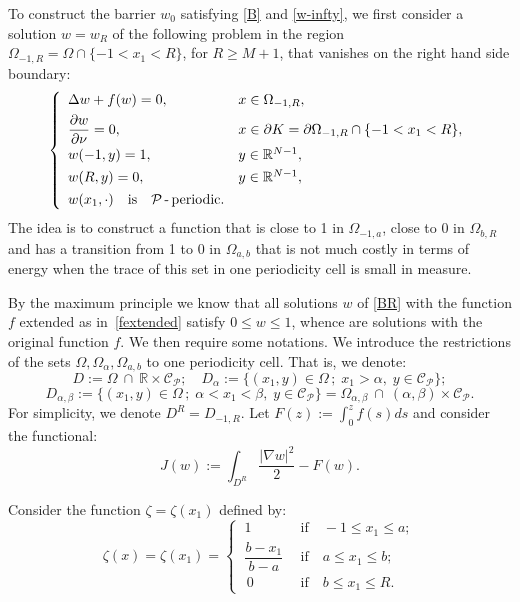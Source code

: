 \documentclass[a4paper,12pt,fullpage]{article}
\numberwithin{equation}{section}
\def\R{{\mathbb R}}
\begin{document}
To construct the barrier $w_0$ satisfying \eqref{B} and \eqref{w-infty}, we first consider a solution $w= w_R$ of the following problem in the region 
$\Omega_{-1,R}= \Omega \cap \{-1 < x_1 < R\}$, for $R\geq M+1$, that vanishes on the right hand side boundary:
\begin{equation}\label{BR}
\left\{
\begin{array}{ll}
\Delta w +f(w)=0, \ \ &x\in \Omega_{-1, R},   \\[4pt]
\dfrac{\partial w}{\partial \nu} = 0, \ \ &x\in \partial K =  \partial\Omega_{-1, R}\cap\{-1 < x_1 < R\},  \\[6pt]
w(-1, y) = 1, &y\in \R^{N-1},\\ [4pt]
w(R, y) = 0, &y\in \R^{N-1},\\ [4pt]
w(x_1, \cdot) \quad\text{is}\quad {\mathcal P}\text{\,-\,periodic}.&\\
\end{array}\right.
\end{equation}
The idea is to construct a function that is close to 1 in $\Omega_{-1, a}$, close to 0 in $\Omega_{b, R}$ and has a transition from 1 to 0 in $\Omega_{a,b}$  that is not much costly in terms of energy when the trace of this set in one periodicity cell is small in measure.

By the maximum principle we know that all solutions $w$ of \eqref{BR} with the function $f$ extended as in~\eqref{fextended} satisfy $0 \leq w \leq 1$, whence are solutions with the original function $f$. We then require some notations. We introduce the restrictions of the sets $\Omega, \Omega_\alpha, \Omega_{a,b}$ to one periodicity cell. That is, we denote:
\[
D:= \Omega\ \cap\ \R\!\times\!{\mathcal C}_{\mathcal P} ; \quad D_\alpha := \{ (x_1, y) \in \Omega\, ; \;  x_1 > \alpha,\;  y \in {\mathcal C}_{\mathcal P}\} ;
\]   
\[ 
D_{\alpha, \beta} := \{ (x_1, y) \in \Omega\, ; \;  \alpha< x_1 < \beta, \; y \in {\mathcal C}_{\mathcal P}\}=\Omega_{\alpha, \beta}\ \cap\ (\alpha, \beta)\!\times\!{\mathcal C} _{\mathcal P}. 
\]
For simplicity, we denote $D^R= D_{-1, R}$. Let $F(z):= \int_0^z f(s)ds$ and consider the functional:
\[
J (w):=  \int_{D^{R}} \frac{ |\nabla w |^2}{2} - F(w).
\]

Consider the function $\zeta= \zeta (x_1)$ defined by:
\begin{equation}\label{zeta}
\zeta (x) = \zeta (x_1)= 
\begin{cases}
\ 1 \quad &\text{if}\quad -1 \leq x_1 \leq a ; \\
\ \dfrac{b- x_1}{b-a} \ \  &\text{if}\quad a \leq x_1 \leq b ; \\
\ \, 0 \quad& \text{if}\quad b \leq x_1 \leq R.
\end{cases}
\end{equation}
\end{document}

